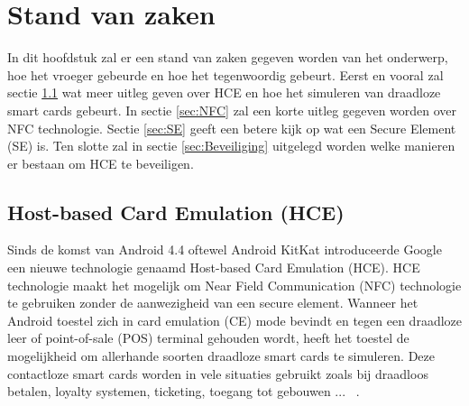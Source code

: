 \chapter{Stand van zaken}
\label{ch:stand-van-zaken}




In dit hoofdstuk zal er een stand van zaken gegeven worden van het onderwerp, hoe het vroeger gebeurde en hoe het tegenwoordig gebeurt. Eerst en vooral zal sectie \ref{sec:HCE} wat meer uitleg geven over HCE en hoe het simuleren van draadloze smart cards gebeurt. In sectie \ref{sec:NFC} zal een korte uitleg gegeven worden over NFC technologie. Sectie \ref{sec:SE} geeft een betere kijk op wat een Secure Element (SE) is. Ten slotte zal in sectie \ref{sec:Beveiliging} uitgelegd worden welke manieren er bestaan om HCE te beveiligen.


\section{Host-based Card Emulation (HCE)}
\label{sec:HCE}
Sinds de komst van Android 4.4 oftewel Android KitKat introduceerde Google een nieuwe technologie genaamd Host-based Card Emulation (HCE). HCE technologie maakt het mogelijk om Near Field Communication (NFC) technologie te gebruiken zonder de aanwezigheid van een secure element. 
Wanneer het Android toestel zich in card emulation (CE) mode bevindt en tegen een draadloze leer of point-of-sale (POS) terminal gehouden wordt, heeft het toestel de mogelijkheid om allerhande soorten draadloze smart cards te simuleren. Deze contactloze smart cards worden in vele situaties gebruikt zoals bij draadloos betalen, loyalty systemen, ticketing, toegang tot gebouwen ... ~\autocite{SCA2014}.

